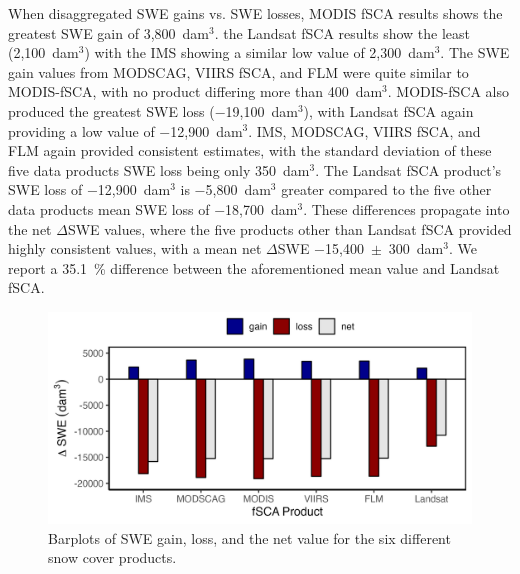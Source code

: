 \clearpage
When disaggregated SWE gains vs. SWE losses, MODIS fSCA results shows the greatest SWE gain of 3,800~dam$^{3}$. the Landsat fSCA results show the least (2,100~dam$^{3}$) with the IMS showing a similar low value of 2,300~dam$^{3}$. The SWE gain values from MODSCAG, VIIRS fSCA, and FLM were quite similar to MODIS-fSCA, with no product differing more than 400~dam$^{3}$.
MODIS-fSCA also produced the greatest SWE loss ($-$19,100~dam$^{3}$), with Landsat fSCA again providing a low value of $-$12,900~dam$^{3}$. IMS, MODSCAG, VIIRS fSCA, and FLM again provided consistent estimates, with the standard deviation of these five data products SWE loss being only 350~dam$^{3}$. The Landsat fSCA product's SWE loss of $-$12,900~dam$^{3}$ is $-$5,800~dam$^{3}$ greater compared to the five other data products mean SWE loss of $-$18,700~dam$^{3}$. These differences propagate into the net $\Delta$SWE values, where the five products other than Landsat fSCA provided highly consistent values, with a mean net $\Delta$SWE $-$15,400~$\pm$~300~dam$^{3}$. We report a 35.1~\% difference between the aforementioned mean value and Landsat fSCA.


\begin{figure}[]
\centering
\includegraphics[width=\textwidth]{figures/ch4_figs/dswe_stats_dam3_v1.png}
\caption{Barplots of SWE gain, loss, and the net value for the six different snow cover products.}
\label{fig:dswe_bar_graph}
\end{figure}

